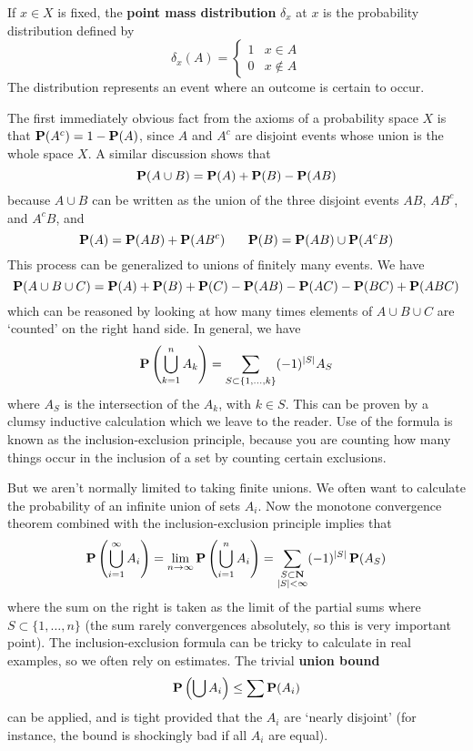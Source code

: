 \begin{example}
    If $x \in X$ is fixed, the {\bf point mass distribution} $\delta_x$ at $x$ is the probability distribution defined by
    \[ \delta_x(A) = \begin{cases} 1 & x \in A \\ 0 & x \not \in A \end{cases} \]
    The distribution represents an event where an outcome is certain to occur.
\end{example}

The first immediately obvious fact from the axioms of a probability space $X$ is that $\operatorname{\mathbf{P}}(A^c) = 1 - \operatorname{\mathbf{P}}(A)$, since $A$ and $A^c$ are disjoint events whose union is the whole space $X$. A similar discussion shows that
%
\[ \operatorname{\mathbf{P}}(A \cup B) = \operatorname{\mathbf{P}}(A) + \operatorname{\mathbf{P}}(B) - \operatorname{\mathbf{P}}(AB) \]
%
because $A \cup B$ can be written as the union of the three disjoint events $AB$, $AB^c$, and $A^cB$, and
%
\[ \Prob(A) = \Prob(AB) + \Prob(AB^c)\ \ \ \ \ \Prob(B) = \Prob(AB) \cup \Prob(A^c B) \]
%
This process can be generalized to unions of finitely many events. We have
%
\[ \operatorname{\mathbf{P}}(A \cup B \cup C) = \operatorname{\mathbf{P}}(A) + \operatorname{\mathbf{P}}(B) + \operatorname{\mathbf{P}}(C) - \operatorname{\mathbf{P}}(AB) - \operatorname{\mathbf{P}}(AC) - \operatorname{\mathbf{P}}(BC) + \operatorname{\mathbf{P}}(ABC) \]
%
which can be reasoned by looking at how many times elements of $A \cup B \cup C$ are `counted' on the right hand side. In general, we have
%
\[ \operatorname{\mathbf{P}} \left( \bigcup_{k = 1}^n A_k \right) = \sum_{S \subset \{ 1, \dots, k \}} (-1)^{|S|} A_S \]
%
where $A_S$ is the intersection of the $A_k$, with $k \in S$. This can be proven by a clumsy inductive calculation which we leave to the reader. Use of the formula is known as the inclusion-exclusion principle, because you are counting how many things occur in the inclusion of a set by counting certain exclusions.

But we aren't normally limited to taking finite unions. We often want to calculate the probability of an infinite union of sets $A_i$. Now the monotone convergence theorem combined with the inclusion-exclusion principle implies that
%
\[ \operatorname{\mathbf{P}} \left(\bigcup_{i = 1}^\infty A_i \right) = \lim_{n \to \infty} \operatorname{\mathbf{P}} \left( \bigcup_{i = 1}^n A_i \right) = \sum_{\substack{S \subset \mathbf{N}\\|S| < \infty}} (-1)^{|S|} \operatorname{\mathbf{P}}(A_S) \]
%
where the sum on the right is taken as the limit of the partial sums where $S \subset \{ 1, \dots, n \}$ (the sum rarely convergences absolutely, so this is very important point). The inclusion-exclusion formula can be tricky to calculate in real examples, so we often rely on estimates. The trivial {\bf union bound}
%
\[ \operatorname{\mathbf{P}} \left( \bigcup A_i \right) \leq \sum \operatorname{\mathbf{P}}(A_i) \]
%
can be applied, and is tight provided that the $A_i$ are `nearly disjoint' (for instance, the bound is shockingly bad if all $A_i$ are equal).

